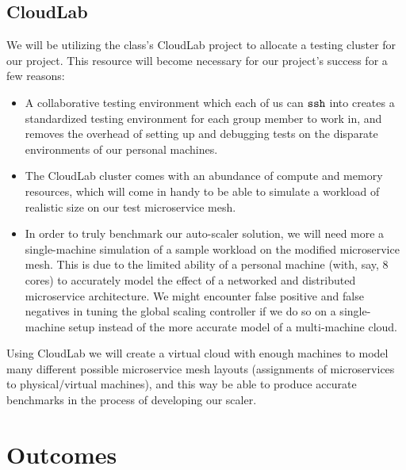 \documentclass{proposal}
\begin{document}
\subsection{CloudLab}
We will be utilizing the class's CloudLab project to allocate a testing cluster for our project. This resource will become necessary for our project's success for a few reasons:
\begin{itemize}
    \item A collaborative testing environment which each of us can $\tt ssh$ into creates a standardized testing environment for each group member to work in, and removes the overhead of setting up and debugging tests on the disparate environments of our personal machines.
    \item The CloudLab cluster comes with an abundance of compute and memory resources, which will come in handy to be able to simulate a workload of realistic size on our test microservice mesh.
    \item In order to truly benchmark our auto-scaler solution, we will need more a single-machine simulation of a sample workload on the modified microservice mesh. This is due to the limited ability of a personal machine (with, say, 8 cores) to accurately model the effect of a networked and distributed microservice architecture. We might encounter false positive and false negatives in tuning the global scaling controller if we do so on a single-machine setup instead of the more accurate model of a multi-machine cloud.
\end{itemize}
Using CloudLab we will create a virtual cloud with enough machines to model many different possible microservice mesh layouts (assignments of microservices to physical/virtual machines), and this way be able to produce accurate benchmarks in the process of developing our scaler.

\section{Outcomes}

 
\begin{small}

\end{small}
\end{document}
